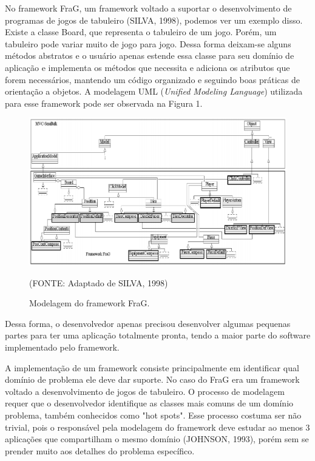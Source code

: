 \documentclass[
    12pt,       %
    openright,      %
    twoside,      %
    a4paper,      %
    english,      %
    french,       %
    spanish,      %
    brazil,       %
    ]{abntex2}
\begin{document}
          No framework FraG, um framework voltado a suportar o desenvolvimento de
          programas de jogos de tabuleiro (SILVA, 1998), podemos ver um exemplo disso. Existe
          a classe Board, que representa o tabuleiro de um jogo. Porém, um
          tabuleiro pode variar muito de jogo para jogo. Dessa
          forma deixam-se alguns métodos abstratos e o usuário apenas estende
          essa classe para seu domínio de aplicação e implementa os métodos que
          necessita e adiciona os atributos que forem necessários, mantendo
          um código organizado e seguindo boas práticas de orientação a objetos.
          A modelagem UML (\textit{Unified Modeling Language}) utilizada para esse
          framework pode ser observada na Figura 1.

          \begin{figure}[htbp]
              \begin{center}
                  \includegraphics[width=1.0\textwidth]{img/frag.png}
              \end{center}
              \caption{\label{fig:passaro}Modelagem do framework FraG.}
              \begin{center}(FONTE: Adaptado de SILVA, 1998)\end{center}
          \end{figure}

          Dessa forma, o desenvolvedor apenas precisou desenvolver algumas pequenas
          partes para ter uma aplicação totalmente pronta, tendo a maior parte
          do software implementado pelo framework.

          A implementação de um framework consiste principalmente em identificar
          qual domínio de problema ele deve dar suporte. No caso do FraG era um
          framework voltado a desenvolvimento de jogos de tabuleiro. O processo
          de modelagem requer que o desenvolvedor identifique as classes mais
          comuns de um domínio problema, também conhecidos como "hot spots".
          Esse processo costuma ser não trivial, pois o responsável pela modelagem
          do framework deve estudar ao menos 3 aplicações que compartilham o
          mesmo domínio (JOHNSON, 1993), porém sem se prender muito aos detalhes
          do problema específico.
\end{document}
